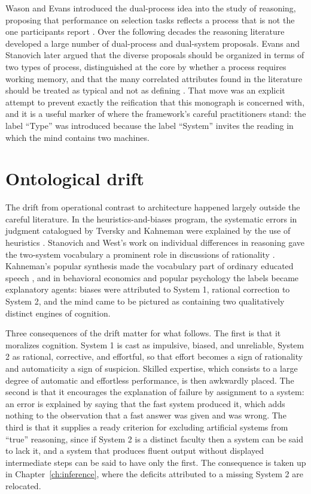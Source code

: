 \documentclass[11pt]{report}
\theoremstyle{remark}
\theoremstyle{definition}
\begin{document}
Wason and Evans introduced the dual-process idea into the study of reasoning, proposing that performance on selection tasks reflects a process that is not the one participants report \cite{wason1974}. Over the following decades the reasoning literature developed a large number of dual-process and dual-system proposals. Evans and Stanovich later argued that the diverse proposals should be organized in terms of two types of process, distinguished at the core by whether a process requires working memory, and that the many correlated attributes found in the literature should be treated as typical and not as defining \cite{evans2013}. That move was an explicit attempt to prevent exactly the reification that this monograph is concerned with, and it is a useful marker of where the framework's careful practitioners stand: the label ``Type'' was introduced because the label ``System'' invites the reading in which the mind contains two machines.

\section{Ontological drift}

The drift from operational contrast to architecture happened largely outside the careful literature. In the heuristics-and-biases program, the systematic errors in judgment catalogued by Tversky and Kahneman were explained by the use of heuristics \cite{tversky1974}. Stanovich and West's work on individual differences in reasoning gave the two-system vocabulary a prominent role in discussions of rationality \cite{stanovich2000}. Kahneman's popular synthesis made the vocabulary part of ordinary educated speech \cite{kahneman2011}, and in behavioral economics and popular psychology the labels became explanatory agents: biases were attributed to System 1, rational correction to System 2, and the mind came to be pictured as containing two qualitatively distinct engines of cognition.

Three consequences of the drift matter for what follows. The first is that it moralizes cognition. System 1 is cast as impulsive, biased, and unreliable, System 2 as rational, corrective, and effortful, so that effort becomes a sign of rationality and automaticity a sign of suspicion. Skilled expertise, which consists to a large degree of automatic and effortless performance, is then awkwardly placed. The second is that it encourages the explanation of failure by assignment to a system: an error is explained by saying that the fast system produced it, which adds nothing to the observation that a fast answer was given and was wrong. The third is that it supplies a ready criterion for excluding artificial systems from ``true'' reasoning, since if System 2 is a distinct faculty then a system can be said to lack it, and a system that produces fluent output without displayed intermediate steps can be said to have only the first. The consequence is taken up in Chapter~\ref{ch:inference}, where the deficits attributed to a missing System 2 are relocated.
\end{document}
